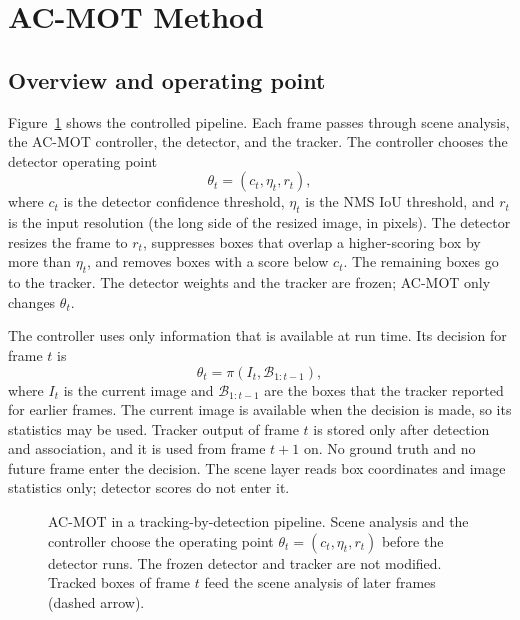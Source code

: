 \section{AC-MOT Method}\label{sec:method}

\subsection{Overview and operating point}
Figure~\ref{fig:pipeline} shows the controlled pipeline. Each frame passes
through scene analysis, the AC-MOT controller, the detector, and the tracker.
The controller chooses the detector operating point
\begin{equation}
\theta_t = (c_t, \eta_t, r_t),
\label{eq:theta}
\end{equation}
where $c_t$ is the detector confidence threshold, $\eta_t$ is the NMS IoU
threshold, and $r_t$ is the input resolution (the long side of the resized
image, in pixels). The detector resizes the frame to $r_t$, suppresses boxes
that overlap a higher-scoring box by more than $\eta_t$, and removes boxes
with a score below $c_t$. The remaining boxes go to the tracker. The detector
weights and the tracker are frozen; AC-MOT only changes $\theta_t$.

The controller uses only information that is available at run time. Its
decision for frame $t$ is
\begin{equation}
\theta_t = \pi\left(I_t, \mathcal{B}_{1:t-1}\right),
\label{eq:policy}
\end{equation}
where $I_t$ is the current image and $\mathcal{B}_{1:t-1}$ are the boxes that
the tracker reported for earlier frames. The current image is available when
the decision is made, so its statistics may be used. Tracker output of frame
$t$ is stored only after detection and association, and it is used from frame
$t+1$ on. No ground truth and no future frame enter the decision. The scene
layer reads box coordinates and image statistics only; detector scores do not
enter it.

\begin{figure}[t]
\centering

\caption{AC-MOT in a tracking-by-detection pipeline. Scene analysis and the
controller choose the operating point $\theta_t=(c_t,\eta_t,r_t)$ before the
detector runs. The frozen detector and tracker are not modified. Tracked boxes
of frame $t$ feed the scene analysis of later frames (dashed arrow).}
\label{fig:pipeline}
\end{figure}

